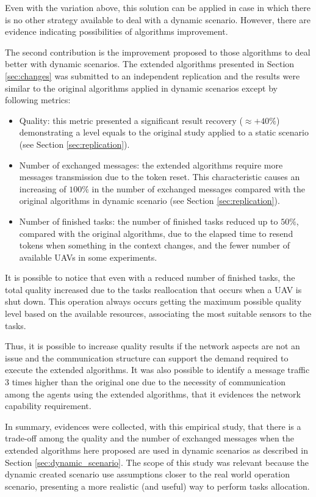 Even with the variation above, this solution can be applied in case in which there is no other strategy available to deal with a dynamic scenario. However, there are evidence indicating possibilities of algorithms improvement.

The second contribution is the improvement proposed to those algorithms to deal better with dynamic scenarios. The extended algorithms presented in Section \ref{sec:changes} was submitted to an independent replication and the results were similar to the original algorithms applied in dynamic scenarios except by following metrics:

\begin{itemize}
   \item Quality: this metric presented a significant result recovery ($\approx +40\%$) demonstrating a level equals to the original study applied to a static scenario (see Section \ref{sec:replication}).
   \item Number of exchanged messages: the extended algorithms require more messages transmission due to the token reset. This characteristic causes an increasing of $100\%$ in the number of exchanged messages compared with the original algorithms in dynamic scenario (see Section \ref{sec:replication}).
   \item Number of finished tasks: the number of finished tasks reduced up to $50\%$, compared with the original algorithms, due to the elapsed time to resend tokens when something in the context changes, and the fewer number of available UAVs in some experiments.
\end{itemize}

It is possible to notice that even with a reduced number of finished tasks, the total quality increased due to the tasks reallocation that occurs when a UAV is shut down. This operation always occurs getting the maximum possible quality level based on the available resources, associating the most suitable sensors to the tasks.

Thus, it is possible to increase quality results if the network aspects are not an issue and the communication structure can support the demand required to execute the extended algorithms. It was also possible to identify a message traffic 3 times higher than the original one due to the necessity of communication among the agents using the extended algorithms, that it evidences the network capability requirement.

In summary, evidences were collected, with this empirical study, that there is a trade-off among the quality and the number of exchanged messages when the extended algorithms here proposed are used in dynamic scenarios as described in Section \ref{sec:dynamic_scenario}. The scope of this study was relevant because the dynamic created scenario use assumptions closer to the real world operation scenario, presenting a more realistic (and useful) way to perform tasks allocation.